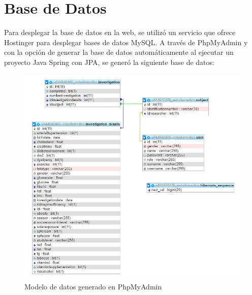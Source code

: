     
    \section{Base de Datos}
    Para desplegar la base de datos en la web, se utilizó un servicio que ofrece Hostinger para desplegar bases de datos MySQL. 
    \newline 
    A través de PhpMyAdmin y con la opción de generar la base de datos automáticamente al ejecutar un proyecto Java Spring con JPA, se generó la siguiente base de datos:
    
     \begin{figure}[h]
    \centering
     \includegraphics[width=1\textwidth]{images/modelodatos}
    \caption{Modelo de datos generado en PhpMyAdmin}
    \end{figure}
    
    
